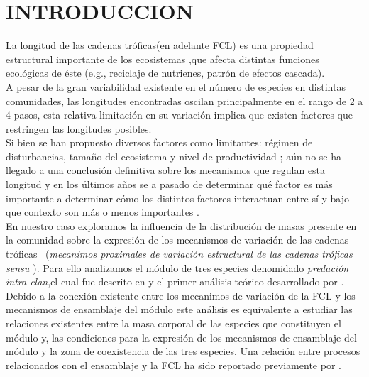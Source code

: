 \section{INTRODUCCION}

La longitud de las cadenas tr\'oficas(en adelante FCL) es una propiedad estructural importante de los ecosistemas ,que afecta distintas funciones ecol\'ogicas de \'este (e.g., reciclaje de nutrienes, patr\'on de efectos cascada).\\
A pesar de la gran variabilidad existente en el n\'umero de especies en distintas comunidades, las longitudes encontradas oscilan principalmente en el rango de 2 a 4 pasos\citep{elton1927animal,pimm1978feeding,yodzis1981structure,williams2004limits}, esta relativa limitaci\'on en su variaci\'on implica que existen factores que restringen las longitudes posibles.\\
Si bien se han propuesto diversos factores como limitantes: r\'egimen de disturbancias, tama\~no del ecosistema y nivel de productividad \citep{post2002long,takimoto2013environmental}; a\'un no se ha llegado a una conclusi\'on definitiva sobre los mecanismos que regulan esta longitud \citep{sterner1997enigma,takimoto2013environmental} y en los \'ultimos a\~nos se a pasado de determinar qu\'e factor es m\'as importante a determinar c\'omo los distintos factores interactuan entre s\'i y bajo que contexto son m\'as o menos importantes \citep{post2002long}.\\

En nuestro caso exploramos la influencia de la distribuci\'on de masas presente en la comunidad sobre la expresi\'on de los mecanismos de variaci\'on de las cadenas tr\'oficas \ (\emph{mecanimos proximales de variaci\'on estructural de las cadenas tr\'oficas sensu \cite{TP2007proximate}}). Para ello analizamos el m\'odulo de tres especies denomidado \emph{predaci\'on intra-clan},el cual fue descrito en \cite{polis1989ecology} y el primer an\'alisis te\'orico desarrollado por \cite{holt1997theoretical}. Debido a la conexi\'on existente entre los mecanimos de variaci\'on de la FCL y los mecanismos de ensamblaje del m\'odulo\citep{TP2007proximate} este an\'alisis es equivalente a estudiar las relaciones existentes entre la masa corporal de las especies que constituyen el m\'odulo y, las condiciones para la expresi\'on de los mecanismos de ensamblaje del m\'odulo y la zona de coexistencia de las tres especies. Una relaci\'on entre procesos relacionados con el ensamblaje y la FCL ha sido reportado previamente por \citet{holt2002food}.\\

